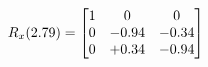 \documentclass[preview]{standalone}
\begin{document}
\begin{align*}
\special{dvisvgm:raw <g id='unique000'>}R_{x}(2.79) = \begin{bmatrix}1 & 0 & 0 \\0 & -0.94 & -0.34 \\0 & +0.34 & -0.94\end{bmatrix}\special{dvisvgm:raw </g>}
\end{align*}
\end{document}
